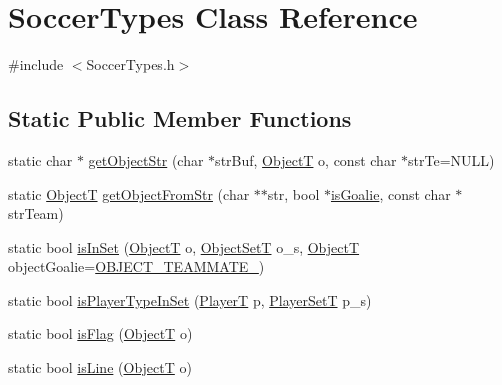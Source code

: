 \hypertarget{classSoccerTypes}{}\section{Soccer\+Types Class Reference}
\label{classSoccerTypes}


{\ttfamily \#include $<$Soccer\+Types.\+h$>$}

\subsection*{Static Public Member Functions}
\begin{DoxyCompactItemize}
\item 
static char $\ast$ \hyperlink{classSoccerTypes_a5f32d677c6400f8b19b3edb19fa32283}{get\+Object\+Str} (char $\ast$str\+Buf, \hyperlink{SoccerTypes_8h_ad4b701fa66e7d26c054ed15b7820c77c}{ObjectT} o, const char $\ast$str\+Te=N\+U\+LL)
\item 
static \hyperlink{SoccerTypes_8h_ad4b701fa66e7d26c054ed15b7820c77c}{ObjectT} \hyperlink{classSoccerTypes_a6bd31e435a9d55a8654adc8630a2484a}{get\+Object\+From\+Str} (char $\ast$$\ast$str, bool $\ast$\hyperlink{classSoccerTypes_a35b0354996d20c68c047162d14359f24}{is\+Goalie}, const char $\ast$str\+Team)
\item 
static bool \hyperlink{classSoccerTypes_addc22247cfbaacd256e68b16427de975}{is\+In\+Set} (\hyperlink{SoccerTypes_8h_ad4b701fa66e7d26c054ed15b7820c77c}{ObjectT} o, \hyperlink{SoccerTypes_8h_a30481b85f5315bc8f0d7a9e0468ea81f}{Object\+SetT} o\+\_\+s, \hyperlink{SoccerTypes_8h_ad4b701fa66e7d26c054ed15b7820c77c}{ObjectT} object\+Goalie=\hyperlink{SoccerTypes_8h_ad4b701fa66e7d26c054ed15b7820c77ca4256d12157ba1b277fcd6c5b1ada9d08}{O\+B\+J\+E\+C\+T\+\_\+\+T\+E\+A\+M\+M\+A\+T\+E\+\_})
\item 
static bool \hyperlink{classSoccerTypes_ad47af414002fdfff182f2d9c8ec877f1}{is\+Player\+Type\+In\+Set} (\hyperlink{SoccerTypes_8h_a88daf580b042467ccd4098107cffc718}{PlayerT} p, \hyperlink{SoccerTypes_8h_afbb545db37d2371bdcf6936de7504d00}{Player\+SetT} p\+\_\+s)
\item 
static bool \hyperlink{classSoccerTypes_a5d3e343c52d9d2fd3d7d3c8ad7c698c9}{is\+Flag} (\hyperlink{SoccerTypes_8h_ad4b701fa66e7d26c054ed15b7820c77c}{ObjectT} o)
\item 
static bool \hyperlink{classSoccerTypes_af50cc869d335bbd3b7409b25fe5c937a}{is\+Line} (\hyperlink{SoccerTypes_8h_ad4b701fa66e7d26c054ed15b7820c77c}{ObjectT} o)
\item 
$$
\end{DoxyCompactItemize}
